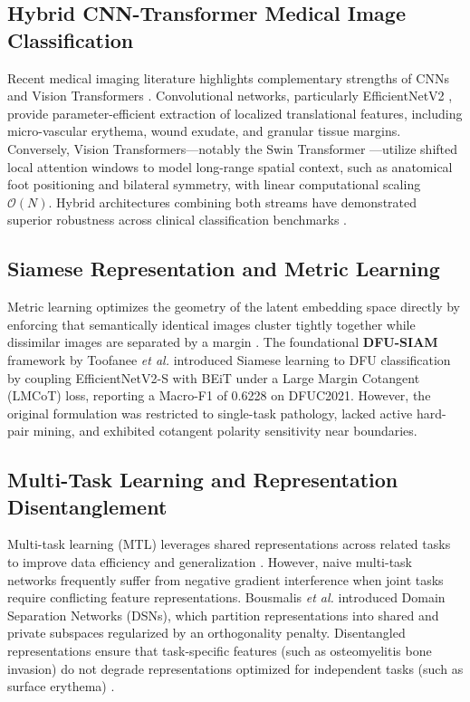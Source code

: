 \documentclass[journal]{IEEEtran}
\begin{document}
\subsection{Hybrid CNN-Transformer Medical Image Classification}
Recent medical imaging literature highlights complementary strengths of CNNs and Vision Transformers \cite{tan2021efficientnetv2, liu2021swin}. Convolutional networks, particularly EfficientNetV2 \cite{tan2021efficientnetv2}, provide parameter-efficient extraction of localized translational features, including micro-vascular erythema, wound exudate, and granular tissue margins. Conversely, Vision Transformers---notably the Swin Transformer \cite{liu2021swin}---utilize shifted local attention windows to model long-range spatial context, such as anatomical foot positioning and bilateral symmetry, with linear computational scaling $\mathcal{O}(N)$. Hybrid architectures combining both streams have demonstrated superior robustness across clinical classification benchmarks \cite{karthik2025attention, mehta2022mobilevit}.

\subsection{Siamese Representation and Metric Learning}
Metric learning optimizes the geometry of the latent embedding space directly by enforcing that semantically identical images cluster tightly together while dissimilar images are separated by a margin \cite{bromley1993signature, chopra2005learning}. The foundational \textbf{DFU-SIAM} framework by Toofanee \textit{et al.} \cite{toofanee2023dfu} introduced Siamese learning to DFU classification by coupling EfficientNetV2-S with BEiT under a Large Margin Cotangent (LMCoT) loss, reporting a Macro-F1 of 0.6228 on DFUC2021. However, the original formulation was restricted to single-task pathology, lacked active hard-pair mining, and exhibited cotangent polarity sensitivity near boundaries.

\subsection{Multi-Task Learning and Representation Disentanglement}
Multi-task learning (MTL) leverages shared representations across related tasks to improve data efficiency and generalization \cite{caruana1997multitask}. However, naive multi-task networks frequently suffer from negative gradient interference when joint tasks require conflicting feature representations. Bousmalis \textit{et al.} \cite{bousmalis2016domain} introduced Domain Separation Networks (DSNs), which partition representations into shared and private subspaces regularized by an orthogonality penalty. Disentangled representations ensure that task-specific features (such as osteomyelitis bone invasion) do not degrade representations optimized for independent tasks (such as surface erythema) \cite{bousmalis2016domain}.
\end{document}
